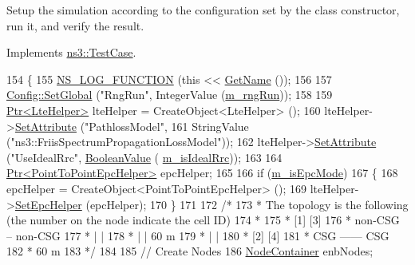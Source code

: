 Setup the simulation according to the configuration set by the class constructor, run it, and verify the result. 



Implements \hyperlink{classns3_1_1TestCase_a8ff74680cf017ed42011e4be51917a24}{ns3\+::\+Test\+Case}.


\begin{DoxyCode}
154 \{
155   \hyperlink{log-macros-disabled_8h_a90b90d5bad1f39cb1b64923ea94c0761}{NS\_LOG\_FUNCTION} (\textcolor{keyword}{this} << \hyperlink{classns3_1_1TestCase_a28f7bb59669c24dae1c290fc17fc9b62}{GetName} ());
156 
157   \hyperlink{group__config_ga0e12663a7bd119b65d0a219a578f2a3c}{Config::SetGlobal} (\textcolor{stringliteral}{"RngRun"}, IntegerValue (\hyperlink{classLteCellSelectionTestCase_a97ba27e3f212deb47d94c92b5e96f2f6}{m\_rngRun}));
158 
159   \hyperlink{classns3_1_1Ptr}{Ptr<LteHelper>} lteHelper = CreateObject<LteHelper> ();
160   lteHelper->\hyperlink{classns3_1_1ObjectBase_ac60245d3ea4123bbc9b1d391f1f6592f}{SetAttribute} (\textcolor{stringliteral}{"PathlossModel"},
161                            StringValue (\textcolor{stringliteral}{"ns3::FriisSpectrumPropagationLossModel"}));
162   lteHelper->\hyperlink{classns3_1_1ObjectBase_ac60245d3ea4123bbc9b1d391f1f6592f}{SetAttribute} (\textcolor{stringliteral}{"UseIdealRrc"}, \hyperlink{classns3_1_1BooleanValue}{BooleanValue} (
      \hyperlink{classLteCellSelectionTestCase_adb806baf13b9fdbfbfe947baa5f45b2a}{m\_isIdealRrc}));
163 
164   \hyperlink{classns3_1_1Ptr}{Ptr<PointToPointEpcHelper>} epcHelper;
165 
166   \textcolor{keywordflow}{if} (\hyperlink{classLteCellSelectionTestCase_a6cbbe728191931290d41ef5ac4fb8b4b}{m\_isEpcMode})
167     \{
168       epcHelper = CreateObject<PointToPointEpcHelper> ();
169       lteHelper->\hyperlink{classns3_1_1LteHelper_a324079a1ccd54ce949786b83d6b95915}{SetEpcHelper} (epcHelper);
170     \}
171 
172   \textcolor{comment}{/*}
173 \textcolor{comment}{   * The topology is the following (the number on the node indicate the cell ID)}
174 \textcolor{comment}{   *}
175 \textcolor{comment}{   *      [1]        [3]}
176 \textcolor{comment}{   *    non-CSG -- non-CSG}
177 \textcolor{comment}{   *       |          |}
178 \textcolor{comment}{   *       |          | 60 m}
179 \textcolor{comment}{   *       |          |}
180 \textcolor{comment}{   *      [2]        [4]}
181 \textcolor{comment}{   *      CSG ------ CSG}
182 \textcolor{comment}{   *           60 m}
183 \textcolor{comment}{   */}
184 
185   \textcolor{comment}{// Create Nodes}
186   \hyperlink{classns3_1_1NodeContainer}{NodeContainer} enbNodes;

\end{DoxyCode}
